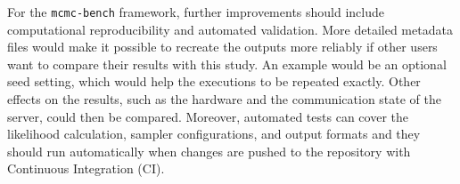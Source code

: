 For the \texttt{mcmc-bench} framework, further improvements should include computational reproducibility and automated validation. More detailed metadata files would make it possible to recreate the outputs more reliably if other users want to compare their results with this study. An example would be an optional seed setting, which would help the executions to be repeated exactly. Other effects on the results, such as the hardware and the communication state of the server, could then be compared. Moreover, automated tests can cover the likelihood calculation, sampler configurations, and output formats and they should run automatically when changes are pushed to the repository with Continuous Integration (CI).
